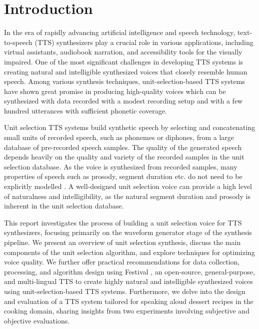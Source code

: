 \documentclass[lettersize,journal]{IEEEtran}
\begin{document}
\section{Introduction}
In the era of rapidly advancing artificial intelligence and speech technology, text-to-speech (TTS) synthesizers play a crucial role in various applications, including virtual assistants, audiobook narration, and accessibility tools for the visually impaired. One of the most significant challenges in developing TTS systems is creating natural and intelligible synthesized voices that closely resemble human speech. Among various synthesis techniques, unit-selection-based TTS systems have shown great promise in producing high-quality voices which can be synthesized with data recorded with a modest recording setup and with a few hundred utterances with sufficient phonetic coverage. %

Unit selection TTS systems build synthetic speech by selecting and concatenating small units of recorded speech, such as phonemes or diphones, from a large database of pre-recorded speech samples. The quality of the generated speech depends heavily on the quality and variety of the recorded samples in the unit selection database. As the voice is synthesized from recorded samples, many properties of speech such as prosody, segment duration etc. do not need to be explicitly modelled \cite{Clark2004Festival2}. A well-designed unit selection voice can provide a high level of naturalness and intelligibility, as the natural segment duration and prosody is inherent in the unit selection database.

This report investigates the process of building a unit selection voice for TTS synthesizers, focusing primarily on the waveform generator stage of the synthesis pipeline. We present an overview of unit selection synthesis, discuss the main components of the unit selection algorithm, and explore techniques for optimizing voice quality. We further offer practical recommendations for data collection, processing, and algorithm design using Festival \cite{Clark2004Festival2}, an open-source, general-purpose, and multi-lingual TTS to create highly natural and intelligible synthesized voices using unit-selection-based TTS systems. Furthermore, we delve into the design and evaluation of a TTS system tailored for speaking aloud dessert recipes in the cooking domain, sharing insights from two experiments involving subjective and objective evaluations. 
\end{document}
